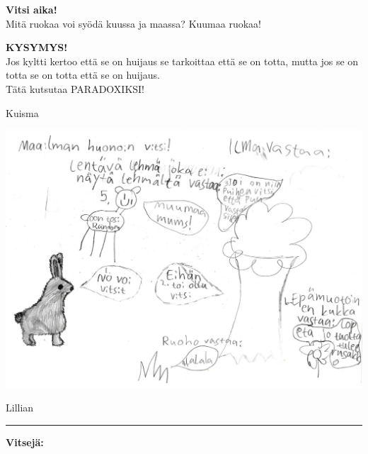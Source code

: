 \noindent\textbf{Vitsi aika!}\\
Mitä ruokaa voi syödä kuussa ja maassa? Kuumaa ruokaa!

\bigskip
\noindent\textbf{KYSYMYS!}\\
Jos kyltti kertoo että se on huijaus se tarkoittaa että se on totta, mutta jos se on totta se on totta että se on huijaus.\\
Tätä kutsutaa PARADOXIKSI!

\bigskip
\noindent Kuisma




\includegraphics[width=1.0\textwidth]{assets/seikkailijat3}

\bigskip
\noindent Lillian

\bigskip
\hrule

\bigskip
\noindent\textbf{Vitsejä:}\\


